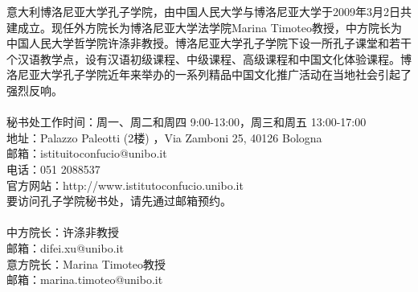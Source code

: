 意大利博洛尼亚大学孔子学院，由中国人民大学与博洛尼亚大学于2009年3月2日共建成立。现任外方院长为博洛尼亚大学法学院Marina Timoteo教授，中方院长为中国人民大学哲学院许涤非教授。博洛尼亚大学孔子学院下设一所孔子课堂和若干个汉语教学点，设有汉语初级课程、中级课程、高级课程和中国文化体验课程。博洛尼亚大学孔子学院近年来举办的一系列精品中国文化推广活动在当地社会引起了强烈反响。  \\
\noindent 
\\
秘书处工作时间：周一、周二和周四 9:00-13:00，周三和周五 13:00-17:00\\
地址：Palazzo Paleotti (2楼) ，Via Zamboni 25, 40126 Bologna\\
邮箱：istituitoconfucio@unibo.it\\
电话：051 2088537\\
官方网站：http://www.istitutoconfucio.unibo.it\\
要访问孔子学院秘书处，请先通过邮箱预约。\\
\\
中方院长：许涤非教授\\
邮箱：difei.xu@unibo.it\\
意方院长：Marina Timoteo教授\\
邮箱：marina.timoteo@unibo.it\\


